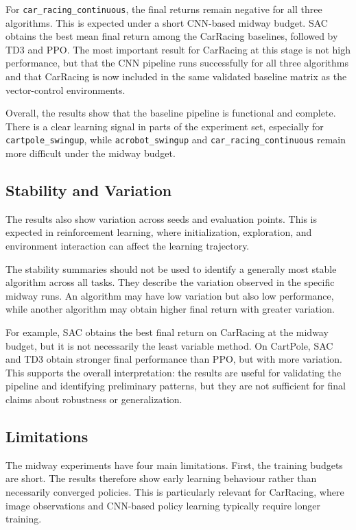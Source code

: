 For \texttt{car\_racing\_continuous}, the final returns remain negative for all three algorithms. This is expected under a short CNN-based midway budget. SAC obtains the best mean final return among the CarRacing baselines, followed by TD3 and PPO. The most important result for CarRacing at this stage is not high performance, but that the CNN pipeline runs successfully for all three algorithms and that CarRacing is now included in the same validated baseline matrix as the vector-control environments.

Overall, the results show that the baseline pipeline is functional and complete. There is a clear learning signal in parts of the experiment set, especially for \texttt{cartpole\_swingup}, while \texttt{acrobot\_swingup} and \texttt{car\_racing\_continuous} remain more difficult under the midway budget.

\subsection{Stability and Variation}
\label{sec:stability-variation}

The results also show variation across seeds and evaluation points. This is expected in reinforcement learning, where initialization, exploration, and environment interaction can affect the learning trajectory.

The stability summaries should not be used to identify a generally most stable algorithm across all tasks. They describe the variation observed in the specific midway runs. An algorithm may have low variation but also low performance, while another algorithm may obtain higher final return with greater variation.

For example, SAC obtains the best final return on CarRacing at the midway budget, but it is not necessarily the least variable method. On CartPole, SAC and TD3 obtain stronger final performance than PPO, but with more variation. This supports the overall interpretation: the results are useful for validating the pipeline and identifying preliminary patterns, but they are not sufficient for final claims about robustness or generalization.

\subsection{Limitations}
\label{sec:experiment-limitations}

The midway experiments have four main limitations. First, the training budgets are short. The results therefore show early learning behaviour rather than necessarily converged policies. This is particularly relevant for CarRacing, where image observations and CNN-based policy learning typically require longer training.

